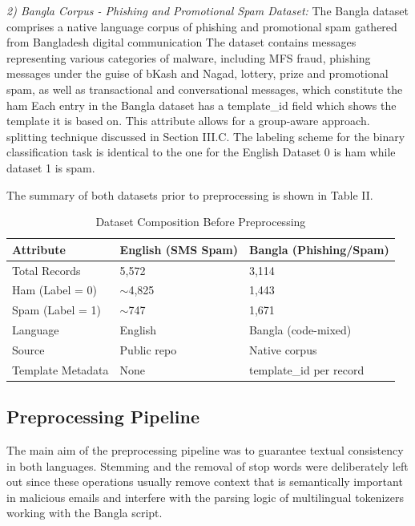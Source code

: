 \documentclass[journal]{IEEEtran}
\begin{document}
\textit{2) Bangla Corpus - Phishing and Promotional Spam Dataset:} The
Bangla dataset comprises a native language corpus of phishing and
promotional spam gathered from Bangladesh digital communication
The dataset contains messages representing various
categories of malware, including MFS fraud, phishing messages under the
guise of bKash and Nagad, lottery, prize and promotional spam, as well
as transactional and conversational messages, which constitute the ham
Each entry in the Bangla dataset has a template\_id field which shows the template it is based on. This attribute allows for a group-aware approach.
splitting technique discussed in Section III.C. The labeling scheme for
the binary classification task is identical to the one for the English
Dataset 0 is ham while dataset 1 is spam.

The summary of both datasets prior to preprocessing is shown in Table
II.

\begin{table}[htbp]
\caption{Dataset Composition Before Preprocessing}
\label{tab:dataset_raw}
\centering
\begin{tabular}{lll}
\toprule
\textbf{Attribute} & \textbf{English (SMS Spam)} & \textbf{Bangla (Phishing/Spam)} \\
\midrule
Total Records & 5,572 & 3,114 \\
Ham (Label = 0) & $\sim$4,825 & 1,443 \\
Spam (Label = 1) & $\sim$747 & 1,671 \\
Language & English & Bangla (code-mixed) \\
Source & Public repo \cite{ref1} & Native corpus \\
Template Metadata & None & template\_id per record \\
\bottomrule
\end{tabular}
\end{table}

\subsection{Preprocessing Pipeline}

The main aim of the preprocessing pipeline was to guarantee textual consistency in both languages. Stemming and the removal of stop words were deliberately left out since these operations usually remove context that is semantically important in malicious emails and interfere with the parsing logic of multilingual tokenizers working with the Bangla script.
\end{document}
